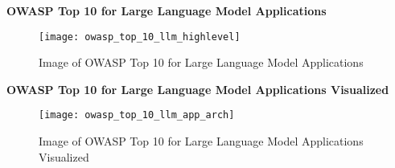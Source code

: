 \textbf{OWASP Top 10 for Large Language Model Applications}
\begin{figure}[ht]
  \centering
  \texttt{[image: owasp\_top\_10\_llm\_highlevel]}
  \caption{Image of OWASP Top 10 for Large Language Model Applications}
  \label{fig:owasp-top-10-llm-highlevel}
\end{figure}

\clearpage
\textbf{OWASP Top 10 for Large Language Model Applications Visualized}
\begin{figure}[ht]
  \centering
  \texttt{[image: owasp\_top\_10\_llm\_app\_arch]}
  \caption{Image of OWASP Top 10 for Large Language Model Applications Visualized}
  \label{fig:owasp-top-10-llm-visualized}
\end{figure}